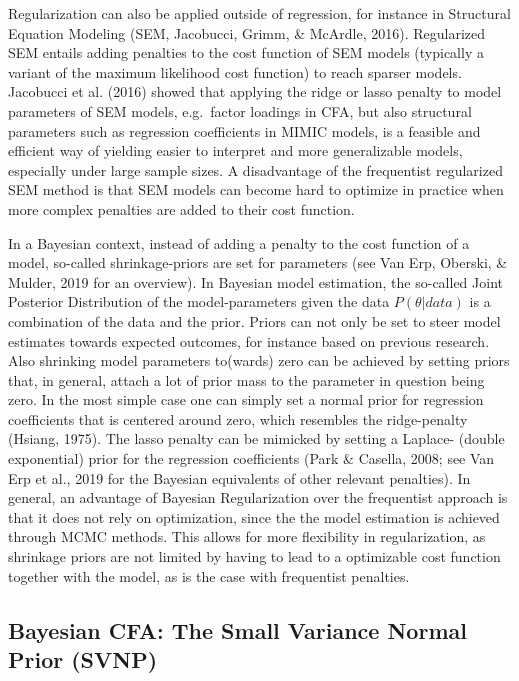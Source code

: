 \documentclass[
  man, donotrepeattitle,floatsintext]{apa6}
\begin{document}
Regularization can also be applied outside of regression, for instance in Structural Equation Modeling (SEM, Jacobucci, Grimm, \& McArdle, 2016). Regularized SEM entails adding penalties to the cost function of SEM models (typically a variant of the maximum likelihood cost function) to reach sparser models. Jacobucci et al. (2016) showed that applying the ridge or lasso penalty to model parameters of SEM models, e.g.~factor loadings in CFA, but also structural parameters such as regression coefficients in MIMIC models, is a feasible and efficient way of yielding easier to interpret and more generalizable models, especially under large sample sizes. A disadvantage of the frequentist regularized SEM method is that SEM models can become hard to optimize in practice when more complex penalties are added to their cost function.

In a Bayesian context, instead of adding a penalty to the cost function of a model, so-called shrinkage-priors are set for parameters (see Van Erp, Oberski, \& Mulder, 2019 for an overview). In Bayesian model estimation, the so-called Joint Posterior Distribution of the model-parameters given the data \(P({\theta} | data)\) is a combination of the data and the prior. Priors can not only be set to steer model estimates towards expected outcomes, for instance based on previous research. Also shrinking model parameters to(wards) zero can be achieved by setting priors that, in general, attach a lot of prior mass to the parameter in question being zero. In the most simple case one can simply set a normal prior for regression coefficients that is centered around zero, which resembles the ridge-penalty (Hsiang, 1975). The lasso penalty can be mimicked by setting a Laplace- (double exponential) prior for the regression coefficients (Park \& Casella, 2008; see Van Erp et al., 2019 for the Bayesian equivalents of other relevant penalties). In general, an advantage of Bayesian Regularization over the frequentist approach is that it does not rely on optimization, since the the model estimation is achieved through MCMC methods. This allows for more flexibility in regularization, as shrinkage priors are not limited by having to lead to a optimizable cost function together with the model, as is the case with frequentist penalties.

\hypertarget{bayesian-cfa-the-small-variance-normal-prior-svnp}{%
\subsection{Bayesian CFA: The Small Variance Normal Prior (SVNP)}\label{bayesian-cfa-the-small-variance-normal-prior-svnp}}
\end{document}
